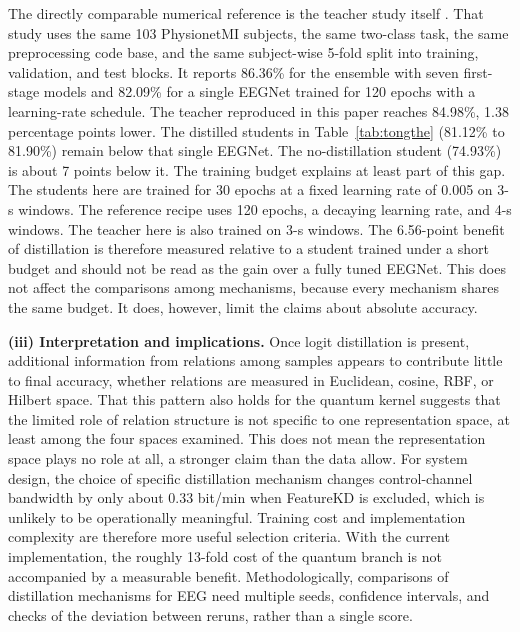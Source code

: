 The directly comparable numerical reference is the teacher study
itself \cite{zoumpourlis2024motor}. That study uses the same 103
PhysionetMI subjects, the same two-class task, the same preprocessing
code base, and the same subject-wise 5-fold split into training,
validation, and test blocks. It reports 86.36\% for the ensemble with
seven first-stage models and 82.09\% for a single EEGNet trained for
120 epochs with a learning-rate schedule. The teacher reproduced in this
paper reaches 84.98\%, 1.38 percentage points lower. The distilled
students in Table~\ref{tab:tongthe} (81.12\% to 81.90\%) remain below
that single EEGNet. The no-distillation student (74.93\%) is about 7
points below it. The training budget explains at least part of this
gap. The students here are trained for 30 epochs at a fixed learning
rate of 0.005 on 3-s windows. The reference recipe uses 120 epochs, a
decaying learning rate, and 4-s windows. The teacher here is also
trained on 3-s windows. The 6.56-point benefit of distillation is
therefore measured relative to a student trained under a short budget
and should not be read as the gain over a fully tuned EEGNet. This does
not affect the comparisons among mechanisms, because every mechanism
shares the same budget. It does, however, limit the claims about
absolute accuracy.

\textbf{(iii) Interpretation and implications.} Once logit distillation
is present, additional information from relations among samples appears
to contribute little to final accuracy, whether relations are measured in
Euclidean, cosine, RBF, or Hilbert space. That this pattern also holds for the quantum kernel suggests that the
limited role of relation structure is not specific to one representation
space, at least among the four spaces examined. This does not mean the representation space plays
no role at all, a stronger claim than the data allow. For system design,
the choice of specific distillation mechanism changes control-channel
bandwidth by only about 0.33 bit/min when FeatureKD is excluded, which is unlikely to be operationally
meaningful. Training cost and implementation complexity are therefore more
useful selection criteria. With
the current implementation, the roughly 13-fold cost of the quantum
branch is not accompanied by a measurable benefit. Methodologically,
comparisons of distillation mechanisms for EEG need multiple seeds,
confidence intervals, and checks of the deviation between reruns, rather
than a single score.


